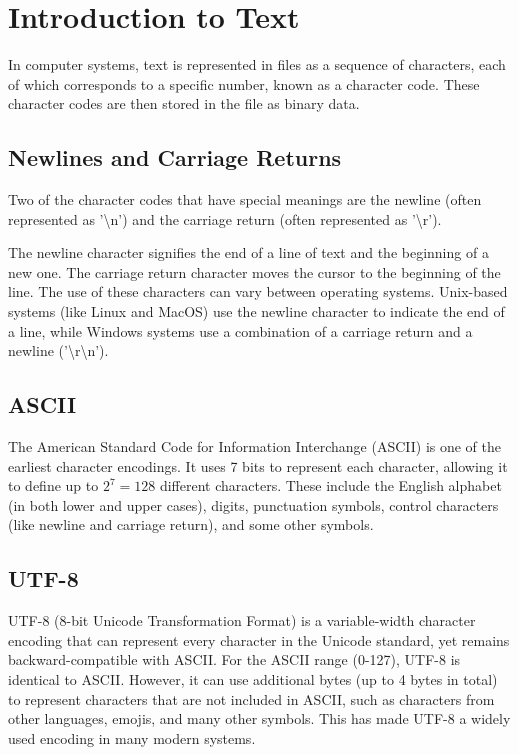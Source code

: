 \chapter{Introduction to Text}


In computer systems, text is represented in files as a sequence of
characters, each of which corresponds to a specific number, known as a
character code. These character codes are then stored in the file as
binary data.

\section{Newlines and Carriage Returns}

Two of the character codes that have special meanings are the newline
(often represented as '\textbackslash n') and the carriage return
(often represented as '\textbackslash r').

The newline character signifies the end of a line of text and the
beginning of a new one. The carriage return character moves the cursor
to the beginning of the line. The use of these characters can vary
between operating systems. Unix-based systems (like Linux and MacOS)
use the newline character to indicate the end of a line, while Windows
systems use a combination of a carriage return and a newline
('\textbackslash r\textbackslash n').

\section{ASCII}

The American Standard Code for Information Interchange (ASCII) is one
of the earliest character encodings. It uses 7 bits to represent each
character, allowing it to define up to $2^7 = 128$ different
characters. These include the English alphabet (in both lower and
upper cases), digits, punctuation symbols, control characters (like
newline and carriage return), and some other symbols.

\section{UTF-8}

UTF-8 (8-bit Unicode Transformation Format) is a variable-width
character encoding that can represent every character in the Unicode
standard, yet remains backward-compatible with ASCII. For the ASCII
range (0-127), UTF-8 is identical to ASCII. However, it can use additional
bytes (up to 4 bytes in total) to represent characters that are not
included in ASCII, such as characters from other languages, emojis,
and many other symbols. This has made UTF-8 a widely used encoding in
many modern systems.
